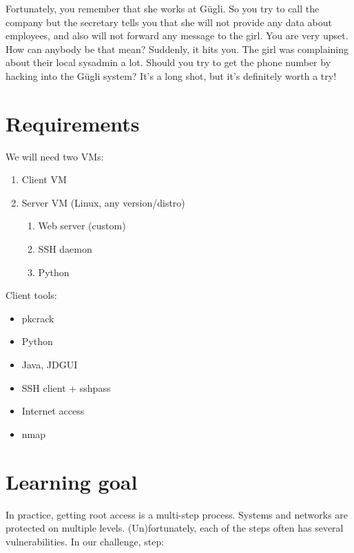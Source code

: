 \documentclass[a4paper]{article}
\begin{document}
Fortunately, you remember that she works at Gügli. So you try to call
the company but the secretary tells you that she will not provide any
data about employees, and also will not forward any message to the girl.
You are very upset. How can anybody be that mean? Suddenly, it hits you.
The girl was complaining about their local sysadmin a lot. Should you
try to get the phone number by hacking into the Gügli system? It's a
long shot, but it's definitely worth a try!

\section{Requirements}

\noindent We will need two VMs:

\begin{enumerate}
  \item Client VM
  \item Server VM (Linux, any version/distro)
        \begin{enumerate}
          \item Web server (custom)
          \item SSH daemon
          \item Python
        \end{enumerate}
\end{enumerate}

\noindent Client tools:

\begin{itemize}
  \item pkcrack
  \item Python
  \item Java, JDGUI
  \item SSH client + sshpass
  \item Internet access
  \item nmap
\end{itemize}

\section{Learning goal}

In practice, getting root access is a multi-step process. Systems and
networks are protected on multiple levels. (Un)fortunately, each of the
steps often has several vulnerabilities. In our challenge, step:
\end{document}
